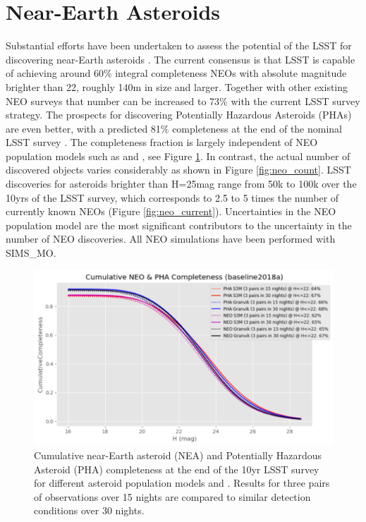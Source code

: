\section{Near-Earth Asteroids}\label{sec:neo}
Substantial efforts have been undertaken to assess the potential of the \gls{LSST} for discovering near-Earth asteroids \citep[e.g.][]{ivezic2006lsst,jones2015asteroid,grav2016modeling,veres2017near,veres2017high,jones2018large,ivezic2019lsst}. The current consensus is that \gls{LSST} is capable of achieving around 60\% integral completeness NEOs with absolute magnitude brighter than 22, roughly 140m in size and larger. Together with other existing \gls{NEO} surveys that number can be increased to 73\% with the current \gls{LSST} survey strategy. The prospects for discovering Potentially Hazardous Asteroids (PHAs) are even better, with a predicted 81\% completeness at the end of the nominal \gls{LSST} survey \citep{ivezic2019lsst}. The completeness fraction is largely independent of \gls{NEO} population models such as \citep[S3M,][]{s3m} and \citet{granvik2018neos}, see Figure \ref{fig:neo_compl}. In contrast, the actual number of discovered objects varies considerably as shown in Figure \ref{fig:neo_count}. \gls{LSST} discoveries for asteroids brighter than H=25mag range from 50k to 100k over the 10yrs of the \gls{LSST} survey, which corresponds to 2.5 to 5 times the number of currently known NEOs (Figure \ref{fig:neo_current}).
Uncertainties in the \gls{NEO} population model are the most significant contributors to the uncertainty in the number of \gls{NEO} discoveries. All \gls{NEO} simulations have been performed with SIMS\_MO.
\begin{figure}[tb!]
\begin{center}
\includegraphics[width=0.65\linewidth]{figs/neo2.png}
\end{center}
\caption{Cumulative near-Earth asteroid (NEA) and Potentially Hazardous Asteroid (\gls{PHA}) completeness at the end of the 10yr \gls{LSST} survey for different asteroid population models \citep[S3M,][]{s3m} and \citet{granvik2018neos}. Results for three pairs of observations over 15 nights are compared to similar detection conditions over 30 nights.}
\label{fig:neo_compl}       %
\end{figure}

